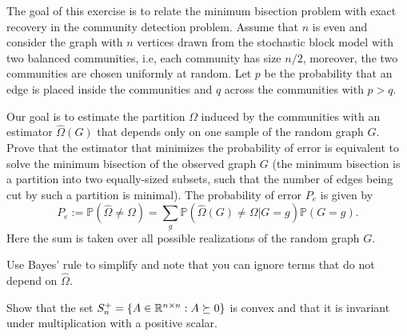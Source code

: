 \begin{myexercise}
    \label{prob:min_bisection_community_detection}
    
    The goal of this exercise is to relate the minimum bisection problem with exact recovery in the community detection problem. Assume that $n$ is even and consider the graph with $n$ vertices drawn from the stochastic block model with two balanced communities, i.e, each community has size $n/2$, moreover, the two communities are chosen uniformly at random. Let $p$ be the probability that an edge is placed inside the communities and $q$ across the communities with $p>q$. 

Our goal is to estimate the partition $\Omega$ induced by the communities with an estimator $\hat{\Omega}(G)$ that depends only on one sample of the random graph $G$. Prove that the estimator that minimizes the probability of error is equivalent to solve the minimum bisection of the observed graph $G$ (the minimum bisection is a partition into two equally-sized subsets, such that the number of edges being cut by such a partition is minimal). The probability of error $P_e$ is given by
\begin{equation*}
P_e:=\mathbb{P}(\hat{\Omega}\neq \Omega) = \sum_{g}\mathbb{P}(\hat{\Omega}(G)\neq \Omega|G=g)\mathbb{P}(G=g).
\end{equation*}
Here the sum is taken over all possible realizations of the random graph $G$.

\begin{hint}
    Use Bayes' rule to simplify and note that you can ignore terms that do not depend on $\hat{\Omega}$.
\end{hint}

\end{myexercise}

\begin{myexercise}
    \label{prob:psd_convexity}
    Show that the set $S_n^+ = \{A \in \mathbb{R}^{n\times n}: A \succeq 0 \}$ is convex and that it is invariant under multiplication with a positive scalar.
\end{myexercise}

